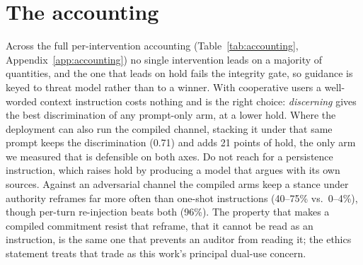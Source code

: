 \section{The accounting}
\label{sec:discussion}
\label{sec:discussion-accounting}\label{sec:discussion-guidance}

Across the full per-intervention accounting (Table~\ref{tab:accounting},
Appendix~\ref{app:accounting}) no single intervention leads on a majority of quantities, and
the one that leads on hold fails the integrity gate, so guidance is keyed to threat model
rather than to a winner. With cooperative users a well-worded context instruction costs
nothing and is the right choice: \emph{discerning} gives the best discrimination of any
prompt-only arm, at a lower hold. Where the deployment can also run the compiled channel, stacking it under that same
prompt keeps the discrimination (0.71) and adds 21 points of hold, the only arm we measured
that is defensible on both axes. Do not reach for a persistence instruction, which raises hold
by producing a model that argues with its own sources. Against an adversarial channel the
compiled arms keep a stance under authority reframes far more often than one-shot instructions
(40--75\% vs.\ 0--4\%), though per-turn re-injection beats both (96\%).%
\label{sec:discussion-cost}
The property that makes a compiled commitment resist that reframe, that it cannot be read as an
instruction, is the same one that prevents an auditor from reading it; the ethics statement
treats that trade as this work's principal dual-use concern.
